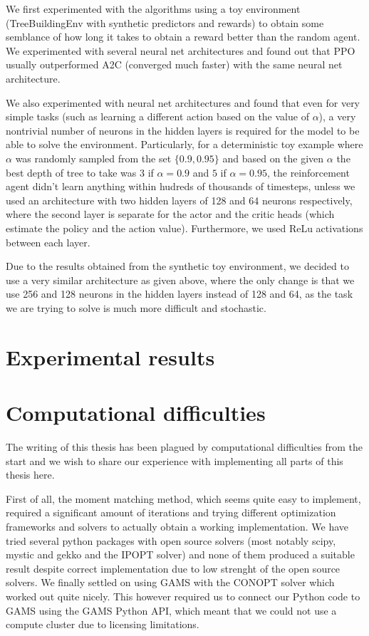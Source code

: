 We first experimented with the algorithms using a toy environment (TreeBuildingEnv with synthetic predictors and rewards) to obtain some semblance of how long it takes to obtain a reward better than the random agent. We experimented with several neural net architectures and found out that PPO usually outperformed A2C (converged much faster) with the same neural net architecture. 

We also experimented with neural net architectures and found that even for very simple tasks (such as learning a different action based on the value of $\alpha$), a very nontrivial number of neurons in the hidden layers is required for the model to be able to solve the environment. Particularly, for a deterministic toy example where $\alpha$ was randomly sampled from the set $\{0.9, 0.95\}$ and based on the given $\alpha$ the best depth of tree to take was $3$ if $\alpha=0.9$ and $5$ if $\alpha=0.95$, the reinforcement agent didn't learn anything within hudreds of thousands of timesteps, unless we used an architecture with two hidden layers of 128 and 64 neurons respectively, where the second layer is separate for the actor and the critic heads (which estimate the policy and the action value). Furthermore, we used ReLu activations between each layer. 

Due to the results obtained from the synthetic toy environment, we decided to use a very similar architecture as given above, where the only change is that we use 256 and 128 neurons in the hidden layers instead of 128 and 64, as the task we are trying to solve is much more difficult and stochastic.

\section{Experimental results}
\label{section:experimental_results}

\section{Computational difficulties}
\label{section:computational_difficulties}
The writing of this thesis has been plagued by computational difficulties from the start and we wish to share our experience with implementing all parts of this thesis here. 

First of all, the moment matching method, which seems quite easy to implement, required a significant amount of iterations and trying different optimization frameworks and solvers to actually obtain a working implementation. We have tried several python packages with open source solvers (most notably scipy, mystic and gekko  and the IPOPT solver) and none of them produced a suitable result despite correct implementation due to low strenght of the open source solvers. We finally settled on using GAMS with the CONOPT solver  which worked out quite nicely. This however required us to connect our Python code to GAMS using the GAMS Python API, which meant that we could not use a compute cluster due to licensing limitations. 

